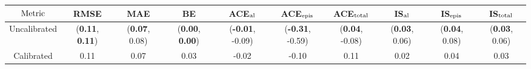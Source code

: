 \begin{table*}
    \begin{tabular}{cccccccccc}
        \toprule
        \toprule
        $\rm{Metric}$ & RMSE & MAE & BE & ACE$_{\rm {al}}$ & ACE$_{\rm {epis}}$ & ACE$_{\rm {total}}$ & IS$_{\rm {al}}$ & IS$_{\rm {epis}}$ & IS$_{\rm {total}}$ \\ \midrule
        Uncalibrated & ({\bf 0.11}, {\bf 0.11}) & ({\bf 0.07}, 0.08) & ({\bf 0.00}, {\bf 0.00}) & (\textbf{-0.01}, -0.09) & (\textbf{-0.31}, -0.59) & (\textbf{0.04}, -0.08) & (\textbf{0.03}, 0.06) & (\textbf{0.04}, 0.08) & (\textbf{0.03}, 0.06) \\
        \midrule
        Calibrated & 0.11 & 0.07 & 0.03 & -0.02 & -0.10 & 0.11 & 0.02 & 0.04 & 0.03 \\
        \bottomrule
    \end{tabular}
    \label{tab:ml_vs_dl_results}
\end{table*}


